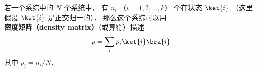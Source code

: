 
若一个系综中的 $N$ 个系统中， 有 $n_i$ （$i = 1,2,\dots,k$） 个在状态 $\ket{i}$ （这里假设 $\ket{i}$ 是正交归一的）． 那么这个系综可以用\textbf{密度矩阵（density matrix）}（或算符）描述
\begin{equation}
\rho = \sum_i p_i\ket{i}\bra{i}   
\end{equation}
其中 $p_i = n_i/N$．
